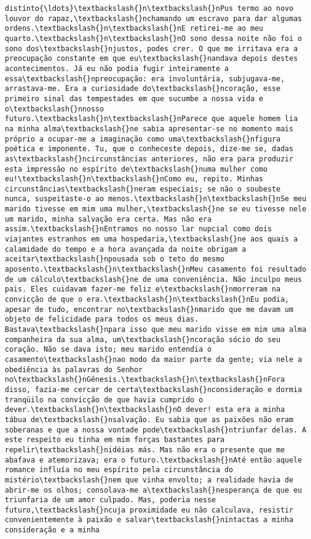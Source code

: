 \begin{Verbatim}[commandchars=\\\{\}]
distinto{\ldots}\textbackslash{}n\textbackslash{}nPus termo ao novo louvor do rapaz,\textbackslash{}nchamando um escravo para dar algumas ordens.\textbackslash{}n\textbackslash{}nE retirei-me ao meu quarto.\textbackslash{}n\textbackslash{}nO sono dessa noite não foi o sono dos\textbackslash{}njustos, podes crer. O que me irritava era a preocupação constante em que eu\textbackslash{}nandava depois destes acontecimentos. Já eu não podia fugir inteiramente a essa\textbackslash{}npreocupação: era involuntária, subjugava-me, arrastava-me. Era a curiosidade do\textbackslash{}ncoração, esse primeiro sinal das tempestades em que sucumbe a nossa vida e o\textbackslash{}nnosso futuro.\textbackslash{}n\textbackslash{}nParece que aquele homem lia na minha alma\textbackslash{}ne sabia apresentar-se no momento mais próprio a ocupar-me a imaginação como uma\textbackslash{}nfigura poética e imponente. Tu, que o conheceste depois, dize-me se, dadas as\textbackslash{}ncircunstâncias anteriores, não era para produzir esta impressão no espírito de\textbackslash{}numa mulher como eu!\textbackslash{}n\textbackslash{}nComo eu, repito. Minhas circunstâncias\textbackslash{}neram especiais; se não o soubeste nunca, suspeitaste-o ao menos.\textbackslash{}n\textbackslash{}nSe meu marido tivesse em mim uma mulher,\textbackslash{}ne se eu tivesse nele um marido, minha salvação era certa. Mas não era assim.\textbackslash{}nEntramos no nosso lar nupcial como dois viajantes estranhos em uma hospedaria,\textbackslash{}ne aos quais a calamidade do tempo e a hora avançada da noite obrigam a aceitar\textbackslash{}npousada sob o teto do mesmo aposento.\textbackslash{}n\textbackslash{}nMeu casamento foi resultado de um cálculo\textbackslash{}ne de uma conveniência. Não inculpo meus pais. Eles cuidavam fazer-me feliz e\textbackslash{}nmorreram na convicção de que o era.\textbackslash{}n\textbackslash{}nEu podia, apesar de tudo, encontrar no\textbackslash{}nmarido que me davam um objeto de felicidade para todos os meus dias. Bastava\textbackslash{}npara isso que meu marido visse em mim uma alma companheira da sua alma, um\textbackslash{}ncoração sócio do seu coração. Não se dava isto; meu marido entendia o casamento\textbackslash{}nao modo da maior parte da gente; via nele a obediência às palavras do Senhor no\textbackslash{}nGênesis.\textbackslash{}n\textbackslash{}nFora disso, fazia-me cercar de certa\textbackslash{}nconsideração e dormia tranqüilo na convicção de que havia cumprido o dever.\textbackslash{}n\textbackslash{}nO dever! esta era a minha tábua de\textbackslash{}nsalvação. Eu sabia que as paixões não eram soberanas e que a nossa vontade pode\textbackslash{}ntriunfar delas. A este respeito eu tinha em mim forças bastantes para repelir\textbackslash{}nidéias más. Mas não era o presente que me abafava e atemorizava; era o futuro.\textbackslash{}nAté então aquele romance influía no meu espírito pela circunstância do mistério\textbackslash{}nem que vinha envolto; a realidade havia de abrir-me os olhos; consolava-me a\textbackslash{}nesperança de que eu triunfaria de um amor culpado. Mas, poderia nesse futuro,\textbackslash{}ncuja proximidade eu não calculava, resistir convenientemente à paixão e salvar\textbackslash{}nintactas a minha consideração e a minha 
\end{Verbatim}
